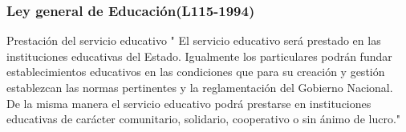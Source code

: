 \documentclass{beamer}
\begin{document}
\begin{frame}
\frametitle{Ley general de Educaci\'on(L115-1994)}
\begin{block}
{Prestaci\'on del servicio educativo}
" El servicio educativo ser\'a prestado en las instituciones educativas del Estado. Igualmente los particulares podr\'an fundar establecimientos educativos en las condiciones que para su creaci\'on y gestión establezcan las normas pertinentes y la reglamentación del Gobierno Nacional.\\
De la misma manera el servicio educativo podr\'a prestarse en instituciones educativas de car\'acter comunitario, solidario, cooperativo o sin \'animo de lucro."
\end{block}
\end{frame}
\end{document}
